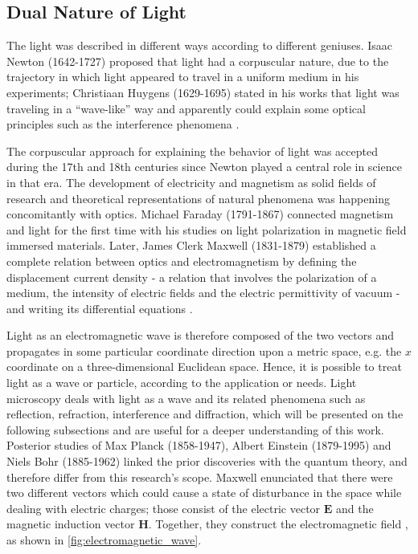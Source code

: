 \subsection{Dual Nature of Light}

The light was described in different ways according to different geniuses. Isaac Newton (1642-1727) proposed that light had a corpuscular nature, due to the trajectory in which light appeared to travel in a uniform medium in his experiments; Christiaan Huygens (1629-1695) stated in his works that light was traveling in a ``wave-like'' way and apparently could explain some optical principles such as the interference phenomena \cite{fowles1989introduction}. 

The corpuscular approach for explaining the behavior of light was accepted during the 17th and 18th centuries since Newton played a central role in science in that era. The development of electricity and magnetism as solid fields of research and theoretical representations of natural phenomena was happening concomitantly with optics. Michael Faraday (1791-1867) connected magnetism and light for the first time with his studies on light polarization in magnetic field immersed materials. Later, James Clerk Maxwell (1831-1879) established a complete relation between optics and electromagnetism by defining the displacement current density - a relation that involves the polarization of a medium, the intensity of electric fields and the electric permittivity of vacuum - and writing its differential equations \cite{zilio2009optica}.

Light as an electromagnetic wave is therefore composed of the two vectors and propagates in some particular coordinate direction upon a metric space, e.g. the $\mathit{x}$ coordinate on a three-dimensional Euclidean space. Hence, it is possible to treat light as a wave or particle, according to the application or needs. Light microscopy deals with light as a wave and its related phenomena such as reflection, refraction, interference and diffraction, which will be presented on the following subsections and are useful for a deeper understanding of this work. Posterior studies of Max Planck (1858-1947), Albert Einstein (1879-1995) and Niels Bohr (1885-1962) \cite{fowles1989introduction} linked the prior discoveries with the quantum theory, and therefore differ from this research's scope. Maxwell enunciated that there were two different vectors which could cause a state of disturbance in the space while dealing with electric charges; those consist of the electric vector $\mathit{\mathbf{E}}$ and the magnetic induction vector $\mathit{\mathbf{H}}$. Together, they construct the electromagnetic field \cite{born1999principles}, as shown in \autoref{fig:electromagnetic_wave}.

